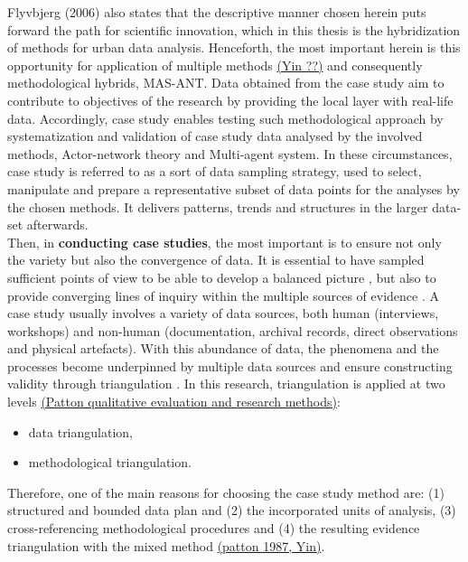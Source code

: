 \documentclass[11pt]{report}
\begin{document}
Flyvbjerg (2006) also states that the descriptive manner chosen herein puts forward the path for scientific innovation, which in this thesis is the hybridization of methods for urban data analysis. Henceforth, the most important herein is this opportunity for application of multiple methods \href{}{(Yin ??)} and consequently methodological hybrids, MAS-ANT. Data obtained from the case study aim to contribute to objectives of the research by providing the local layer with real-life data.
Accordingly, case study enables testing such methodological approach by systematization and validation of case study data analysed by the involved methods, Actor-network theory and Multi-agent system.
In these circumstances, case study is referred to as a sort of data sampling strategy, used to select, manipulate and prepare a representative subset of data points for the analyses by the chosen methods. It delivers patterns, trends and structures in the larger data-set afterwards.
\\

Then, in \textbf{conducting case studies}, the most important is to ensure not only the variety but also the convergence of data. It is essential to have sampled  sufficient  points  of  view  to be able to develop a balanced picture \cite{(Harrison 2002)}, but also to provide converging lines of inquiry within the multiple sources of evidence \cite{(Yin 2009)}.
A case study usually involves a variety of data sources, both human (interviews, workshops) and non-human (documentation, archival records, direct observations and physical artefacts).
With this abundance of data, the phenomena and the processes become underpinned by multiple data sources and ensure constructing validity through triangulation \cite{(Denzin 1987b}. In this research, triangulation is applied at two levels \href{}{(Patton qualitative evaluation and research methods)}:

\begin{itemize}
\item data triangulation,
\item methodological triangulation. 
\end{itemize}

Therefore, one of the main reasons for choosing the case study method are: (1) structured and bounded data plan and (2) the incorporated units of analysis, (3) cross-referencing methodological procedures and (4) the resulting evidence triangulation with the mixed method \href{}{(patton 1987, Yin)}.
\\
\end{document}
